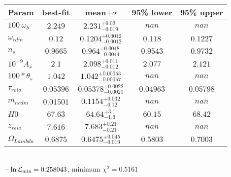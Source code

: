 \begin{tabular}{|l|c|c|c|c|} 
 \hline 
Param & best-fit & mean$\pm\sigma$ & 95\% lower & 95\% upper \\ \hline 
$100~\omega{}_{b }$ &$2.249$ & $2.231_{-0.019}^{+0.02}$ & $nan$ & $nan$ \\ 
$\omega{}_{cdm }$ &$0.12$ & $0.1204_{-0.0012}^{+0.0012}$ & $0.118$ & $0.1227$ \\ 
$n_{s }$ &$0.9665$ & $0.964_{-0.0044}^{+0.0048}$ & $0.9543$ & $0.9732$ \\ 
$10^{+9}A_{s }$ &$2.1$ & $2.098_{-0.012}^{+0.011}$ & $2.077$ & $2.121$ \\ 
$100*\theta{}_{s }$ &$1.042$ & $1.042_{-0.00057}^{+0.00053}$ & $nan$ & $nan$ \\ 
$\tau{}_{reio }$ &$0.05396$ & $0.05378_{-0.0021}^{+0.0022}$ & $0.04963$ & $0.05798$ \\ 
$m_{ncdm }$ &$0.01501$ & $0.1154_{-0.12}^{+0.032}$ & $nan$ & $nan$ \\ 
$H0$ &$67.63$ & $64.64_{-1.6}^{+3.1}$ & $60.15$ & $68.42$ \\ 
$z_{reio }$ &$7.616$ & $7.683_{-0.21}^{+0.21}$ & $nan$ & $nan$ \\ 
$\Omega{}_{Lambda }$ &$0.6875$ & $0.6475_{-0.019}^{+0.045}$ & $0.5803$ & $0.7003$ \\ 
\hline 
 \end{tabular} \\ 
$-\ln{\cal L}_\mathrm{min} =0.258043$, minimum $\chi^2=0.5161$ \\ 
